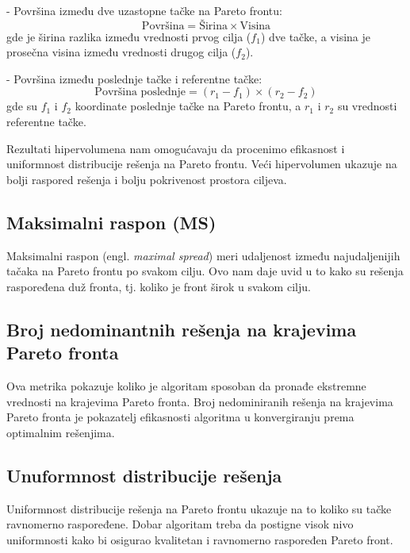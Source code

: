 \documentclass[12pt]{article}
\begin{document}
- Površina između dve uzastopne tačke na Pareto frontu:
  \[
  \text{Površina} = \text{Širina} \times \text{Visina}
  \]
  gde je širina razlika između vrednosti prvog cilja (\( f_1 \)) dve tačke, a visina je prosečna visina između vrednosti drugog cilja (\( f_2 \)).

- Površina između poslednje tačke i referentne tačke:
  \[
  \text{Površina poslednje} = (r_1 - f_1) \times (r_2 - f_2)
  \]
  gde su \( f_1 \) i \( f_2 \) koordinate poslednje tačke na Pareto frontu, a \( r_1 \) i \( r_2 \) su vrednosti referentne tačke.

Rezultati hipervolumena nam omogućavaju da procenimo efikasnost i uniformnost distribucije rešenja na Pareto frontu. Veći hipervolumen ukazuje na bolji raspored rešenja i bolju pokrivenost prostora ciljeva.


\subsection{Maksimalni raspon (MS)}
Maksimalni raspon (engl. \textit{maximal spread}) meri udaljenost između najudaljenijih tačaka na Pareto frontu po svakom cilju. Ovo nam daje uvid u to kako su rešenja raspoređena duž fronta, tj. koliko je front širok u svakom cilju.

 	
 	
\subsection{Broj nedominantnih rešenja na krajevima Pareto fronta}
Ova metrika pokazuje koliko je algoritam sposoban da pronađe ekstremne vrednosti na krajevima Pareto fronta. Broj nedominiranih rešenja na krajevima Pareto fronta je pokazatelj efikasnosti algoritma u konvergiranju prema optimalnim rešenjima.



\subsection{Unuformnost distribucije rešenja}
Uniformnost distribucije rešenja na Pareto frontu ukazuje na to koliko su tačke ravnomerno raspoređene. Dobar algoritam treba da postigne visok nivo uniformnosti kako bi osigurao kvalitetan i ravnomerno raspoređen Pareto front.
\end{document}
